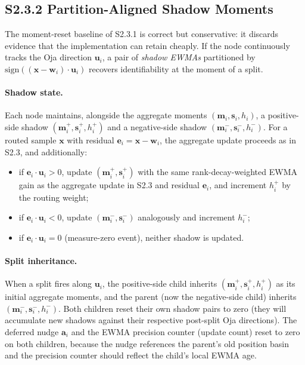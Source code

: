 \documentclass[11pt]{article}
\begin{document}
\subsection*{S2.3.2 Partition-Aligned Shadow Moments}
\label{sec:si-shadow-moments}

The moment-reset baseline of S2.3.1 is correct but conservative: it discards evidence that the implementation can retain cheaply. If the node continuously tracks the Oja direction $\mathbf u_i$, a pair of \emph{shadow EWMAs} partitioned by $\mathrm{sign}((\mathbf x-\mathbf w_i)\cdot\mathbf u_i)$ recovers identifiability at the moment of a split.

\paragraph{Shadow state.}
Each node maintains, alongside the aggregate moments $(\mathbf m_i,\mathbf s_i,h_i)$, a positive-side shadow $(\mathbf m_i^+,\mathbf s_i^+,h_i^+)$ and a negative-side shadow $(\mathbf m_i^-,\mathbf s_i^-,h_i^-)$. For a routed sample $\mathbf x$ with residual $\mathbf e_i=\mathbf x-\mathbf w_i$, the aggregate update proceeds as in S2.3, and additionally:
\begin{itemize}[leftmargin=1.5em]
  \item if $\mathbf e_i\cdot\mathbf u_i>0$, update $(\mathbf m_i^+,\mathbf s_i^+)$ with the same rank-decay-weighted EWMA gain as the aggregate update in S2.3 and residual $\mathbf e_i$, and increment $h_i^+$ by the routing weight;
  \item if $\mathbf e_i\cdot\mathbf u_i<0$, update $(\mathbf m_i^-,\mathbf s_i^-)$ analogously and increment $h_i^-$;
  \item if $\mathbf e_i\cdot\mathbf u_i=0$ (measure-zero event), neither shadow is updated.
\end{itemize}

\paragraph{Split inheritance.}
When a split fires along $\mathbf u_i$, the positive-side child inherits $(\mathbf m_i^+,\mathbf s_i^+,h_i^+)$ as its initial aggregate moments, and the parent (now the negative-side child) inherits $(\mathbf m_i^-,\mathbf s_i^-,h_i^-)$. Both children reset their own shadow pairs to zero (they will accumulate new shadows against their respective post-split Oja directions). The deferred nudge $\mathbf a_i$ and the EWMA precision counter (update count) reset to zero on both children, because the nudge references the parent's old position basin and the precision counter should reflect the child's local EWMA age.
\end{document}
